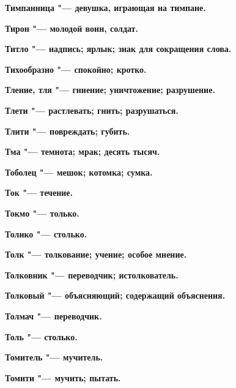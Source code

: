 \begin{mymulticols}{2}
\bfseries Тимпанница\normalfont{} "--- девушка, играющая на тимпане. 




\bfseries Тирон\normalfont{} "--- молодой воин, солдат. 




\bfseries Титло\normalfont{} "--- надпись; ярлык; знак для сокращения слова. 




\bfseries Тихообразно\normalfont{} "--- спокойно; кротко. 




\bfseries Тление, тля\normalfont{} "--- гниение; уничтожение; разрушение. 




\bfseries Тлети\normalfont{} "--- растлевать; гнить; разрушаться. 




\bfseries Тлити\normalfont{} "--- повреждать; губить. 




\bfseries Тма\normalfont{} "--- темнота; мрак; десять тысяч. 




\bfseries Тоболец\normalfont{} "--- мешок; котомка; сумка. 




\bfseries Ток\normalfont{} "--- течение. 




\bfseries Токмо\normalfont{} "--- только. 




\bfseries Толико\normalfont{} "--- столько. 




\bfseries Толк\normalfont{} "--- толкование; учение; особое мнение. 




\bfseries Толковник\normalfont{} "--- переводчик; истолкователь. 




\bfseries Толковый\normalfont{} "--- объясняющий; содержащий объяснения. 




\bfseries Толмач\normalfont{} "--- переводчик. 




\bfseries Толь\normalfont{} "--- столько. 




\bfseries Томитель\normalfont{} "--- мучитель. 




\bfseries Томити\normalfont{} "--- мучить; пытать. 





\end{mymulticols}
